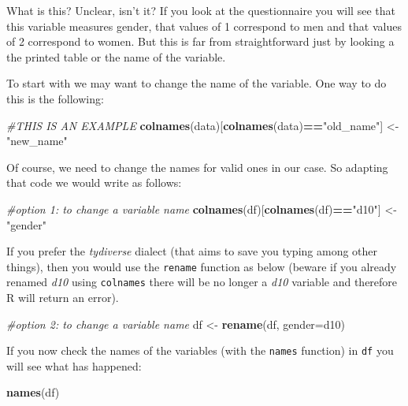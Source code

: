 \documentclass[
]{book}
\newenvironment{Shaded}{\begin{snugshade}}{\end{snugshade}}
\newcommand{\AttributeTok}[1]{\textcolor[rgb]{0.13,0.29,0.53}{#1}}
\newcommand{\CommentTok}[1]{\textcolor[rgb]{0.56,0.35,0.01}{\textit{#1}}}
\newcommand{\FunctionTok}[1]{\textcolor[rgb]{0.13,0.29,0.53}{\textbf{#1}}}
\newcommand{\NormalTok}[1]{#1}
\newcommand{\OtherTok}[1]{\textcolor[rgb]{0.56,0.35,0.01}{#1}}
\newcommand{\SpecialCharTok}[1]{\textcolor[rgb]{0.81,0.36,0.00}{\textbf{#1}}}
\newcommand{\StringTok}[1]{\textcolor[rgb]{0.31,0.60,0.02}{#1}}
\begin{document}
What is this? Unclear, isn't it? If you look at the questionnaire you will see that this variable measures gender, that values of 1 correspond to men and that values of 2 correspond to women. But this is far from straightforward just by looking a the printed table or the name of the variable.

To start with we may want to change the name of the variable. One way to do this is the following:

\begin{Shaded}
\begin{Highlighting}[]
\CommentTok{\#THIS IS AN EXAMPLE}
\FunctionTok{colnames}\NormalTok{(data)[}\FunctionTok{colnames}\NormalTok{(data)}\SpecialCharTok{==}\StringTok{"old\_name"}\NormalTok{] }\OtherTok{\textless{}{-}} \StringTok{"new\_name"}
\end{Highlighting}
\end{Shaded}

Of course, we need to change the names for valid ones in our case. So adapting that code we would write as follows:

\begin{Shaded}
\begin{Highlighting}[]
\CommentTok{\#option 1: to change a variable name}
\FunctionTok{colnames}\NormalTok{(df)[}\FunctionTok{colnames}\NormalTok{(df)}\SpecialCharTok{==}\StringTok{"d10"}\NormalTok{] }\OtherTok{\textless{}{-}} \StringTok{"gender"}
\end{Highlighting}
\end{Shaded}

If you prefer the \emph{tydiverse} dialect (that aims to save you typing among other things), then you would use the \texttt{rename} function as below (beware if you already renamed \emph{d10} using \texttt{colnames} there will be no longer a \emph{d10} variable and therefore R will return an error).

\begin{Shaded}
\begin{Highlighting}[]
\CommentTok{\#option 2: to change a variable name}
\NormalTok{df }\OtherTok{\textless{}{-}} \FunctionTok{rename}\NormalTok{(df, }\AttributeTok{gender=}\NormalTok{d10)}
\end{Highlighting}
\end{Shaded}

If you now check the names of the variables (with the \texttt{names} function) in \texttt{df} you will see what has happened:

\begin{Shaded}
\begin{Highlighting}[]
\FunctionTok{names}\NormalTok{(df)}
\end{Highlighting}
\end{Shaded}
\end{document}
